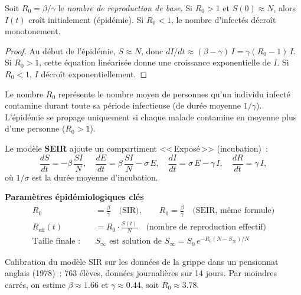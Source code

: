 \begin{theoreme}
\label{thm:seuil_sir}
Soit $R_0 = \beta / \gamma$ le
\emph{nombre de reproduction de base}. Si $R_0 > 1$ et $S(0) \approx N$,
alors $I(t)$ cro\^it initialement (\'epid\'emie). Si $R_0 < 1$,
le nombre d'infect\'es d\'ecro\^it monotonement.
\end{theoreme}

\begin{proof}
Au d\'ebut de l'\'epid\'emie, $S \approx N$, donc
$dI/dt \approx (\beta - \gamma)\,I = \gamma(R_0 - 1)\,I$.
Si $R_0 > 1$, cette \'equation lin\'earis\'ee donne une croissance
exponentielle de $I$. Si $R_0 < 1$, $I$ d\'ecro\^it exponentiellement.
\end{proof}

\begin{intuition}
Le nombre $R_0$ repr\'esente le nombre moyen de personnes qu'un individu
infect\'e contamine durant toute sa p\'eriode infectieuse (de dur\'ee
moyenne $1/\gamma$). L'\'epid\'emie se propage uniquement si chaque
malade contamine en moyenne plus d'une personne ($R_0 > 1$).
\end{intuition}

\begin{definition}
Le mod\`ele \textbf{SEIR} ajoute un compartiment <<\,Expos\'e\,>> (incubation)~:
\[
  \frac{dS}{dt} = -\beta\, \frac{SI}{N}, \quad
  \frac{dE}{dt} = \beta\, \frac{SI}{N} - \sigma\, E, \quad
  \frac{dI}{dt} = \sigma\, E - \gamma\, I, \quad
  \frac{dR}{dt} = \gamma\, I,
\]
o\`u $1/\sigma$ est la dur\'ee moyenne d'incubation.
\end{definition}

\begin{formules}
\textbf{Param\`etres \'epid\'emiologiques cl\'es}
\begin{align*}
  R_0 &= \frac{\beta}{\gamma} \quad \text{(SIR)}, \qquad
  R_0 = \frac{\beta}{\gamma} \quad \text{(SEIR, m\^eme formule)} \\[4pt]
  R_{\text{eff}}(t) &= R_0 \cdot \frac{S(t)}{N}
    \quad \text{(nombre de reproduction effectif)} \\[4pt]
  \text{Taille finale :}\quad & S_\infty \text{ est solution de }
    S_\infty = S_0\, e^{-R_0(N - S_\infty)/N}
\end{align*}
\end{formules}

\begin{exemple}
Calibration du mod\`ele SIR sur les donn\'ees de la grippe dans un
pensionnat anglais (1978)~: 763 \'el\`eves, donn\'ees journali\`eres
sur 14 jours. Par moindres carr\'es, on estime $\beta \approx 1.66$ et
$\gamma \approx 0.44$, soit $R_0 \approx 3.78$.
\end{exemple}

